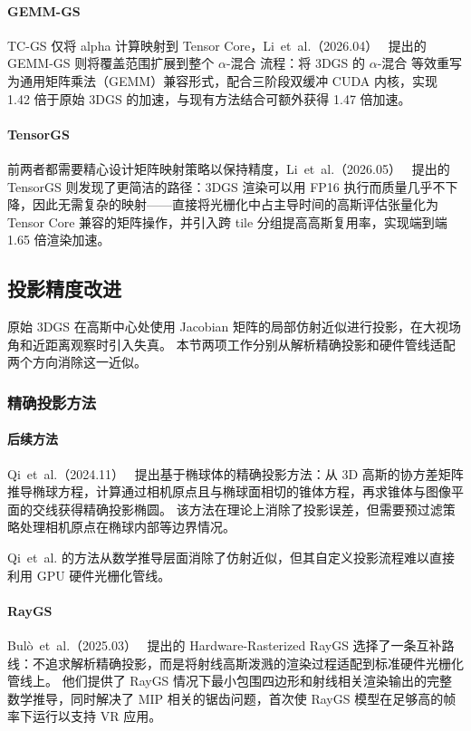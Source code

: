 \paragraph{GEMM-GS}
TC-GS 仅将 alpha 计算映射到 Tensor Core，Li~et~al.（2026.04）~\cite{2604_02120} 提出的 GEMM-GS 则将覆盖范围扩展到整个 $\alpha$-混合 流程：将 3DGS 的 $\alpha$-混合 等效重写为通用矩阵乘法（GEMM）兼容形式，配合三阶段双缓冲 CUDA 内核，实现 1.42 倍于原始 3DGS 的加速，与现有方法结合可额外获得 1.47 倍加速。

\paragraph{TensorGS}
前两者都需要精心设计矩阵映射策略以保持精度，Li~et~al.（2026.05）~\cite{2605_17855} 提出的 TensorGS 则发现了更简洁的路径：3DGS 渲染可以用 FP16 执行而质量几乎不下降，因此无需复杂的映射——直接将光栅化中占主导时间的高斯评估张量化为 Tensor Core 兼容的矩阵操作，并引入跨 tile 分组提高高斯复用率，实现端到端 1.65 倍渲染加速。

\subsection{投影精度改进}

原始 3DGS 在高斯中心处使用 Jacobian 矩阵的局部仿射近似进行投影，在大视场角和近距离观察时引入失真。
本节两项工作分别从解析精确投影和硬件管线适配两个方向消除这一近似。

\subsubsection{精确投影方法}

\paragraph{后续方法}
Qi~et~al.（2024.11）~\cite{2411_07579} 提出基于椭球体的精确投影方法：从 3D 高斯的协方差矩阵推导椭球方程，计算通过相机原点且与椭球面相切的锥体方程，再求锥体与图像平面的交线获得精确投影椭圆。
该方法在理论上消除了投影误差，但需要预过滤策略处理相机原点在椭球内部等边界情况。

Qi~et~al. 的方法从数学推导层面消除了仿射近似，但其自定义投影流程难以直接利用 GPU 硬件光栅化管线。
\paragraph{RayGS}

Bul\`o~et~al.（2025.03）~\cite{2503_18682} 提出的 Hardware-Rasterized RayGS 选择了一条互补路线：不追求解析精确投影，而是将射线高斯泼溅的渲染过程适配到标准硬件光栅化管线上。
他们提供了 RayGS 情况下最小包围四边形和射线相关渲染输出的完整数学推导，同时解决了 MIP 相关的锯齿问题，首次使 RayGS 模型在足够高的帧率下运行以支持 VR 应用。

